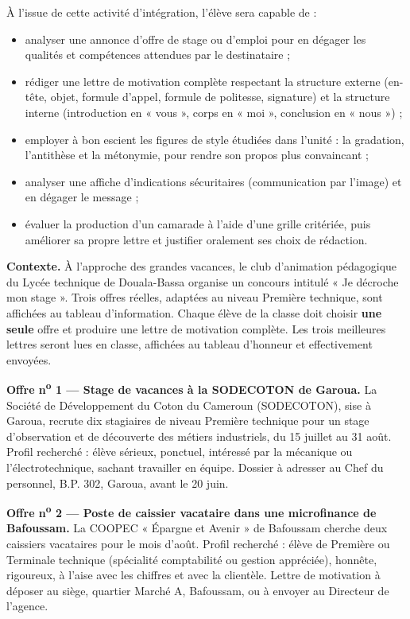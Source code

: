 \documentclass[11pt]{article}
\newcommand{\cle}[1]{{\popxbold\color{popdark}#1}}
\newcounter{popsec}
\newcounter{popsub}
\newcommand{\courssub}[1]{%
  \stepcounter{popsub}%
  \par\vspace{9pt}\noindent{\popxbold\fontsize{11.5}{13}\selectfont\color{popink}{\color{poporange}\thepopsec.\thepopsub}\hspace{6pt}#1}\par\nopagebreak\vspace{4pt}
}
\begin{document}
À l'issue de cette activité d'intégration, l'élève sera capable de :
\begin{itemize}
\item analyser une annonce d'offre de stage ou d'emploi pour en dégager les qualités et compétences attendues par le destinataire ;
\item rédiger une lettre de motivation complète respectant la \cle{structure externe} (en-tête, objet, formule d'appel, formule de politesse, signature) et la \cle{structure interne} (introduction en « vous », corps en « moi », conclusion en « nous ») ;
\item employer à bon escient les figures de style étudiées dans l'unité : la \cle{gradation}, l'\cle{antithèse} et la \cle{métonymie}, pour rendre son propos plus convaincant ;
\item analyser une affiche d'indications sécuritaires (communication par l'image) et en dégager le message ;
\item évaluer la production d'un camarade à l'aide d'une grille critériée, puis améliorer sa propre lettre et justifier oralement ses choix de rédaction.
\end{itemize}

\courssub{Situation}

\textbf{Contexte.} À l'approche des grandes vacances, le club d'animation pédagogique du Lycée technique de Douala-Bassa organise un concours intitulé « Je décroche mon stage ». Trois offres réelles, adaptées au niveau Première technique, sont affichées au tableau d'information. Chaque élève de la classe doit choisir \textbf{une seule} offre et produire une lettre de motivation complète. Les trois meilleures lettres seront lues en classe, affichées au tableau d'honneur et effectivement envoyées.

\textbf{Offre n\textsuperscript{o} 1 --- Stage de vacances à la SODECOTON de Garoua.} La Société de Développement du Coton du Cameroun (SODECOTON), sise à Garoua, recrute dix stagiaires de niveau Première technique pour un stage d'observation et de découverte des métiers industriels, du 15 juillet au 31 août. Profil recherché : élève sérieux, ponctuel, intéressé par la mécanique ou l'électrotechnique, sachant travailler en équipe. Dossier à adresser au Chef du personnel, B.P. 302, Garoua, avant le 20 juin.

\textbf{Offre n\textsuperscript{o} 2 --- Poste de caissier vacataire dans une microfinance de Bafoussam.} La COOPEC « Épargne et Avenir » de Bafoussam cherche deux caissiers vacataires pour le mois d'août. Profil recherché : élève de Première ou Terminale technique (spécialité comptabilité ou gestion appréciée), honnête, rigoureux, à l'aise avec les chiffres et avec la clientèle. Lettre de motivation à déposer au siège, quartier Marché A, Bafoussam, ou à envoyer au Directeur de l'agence.
\end{document}
